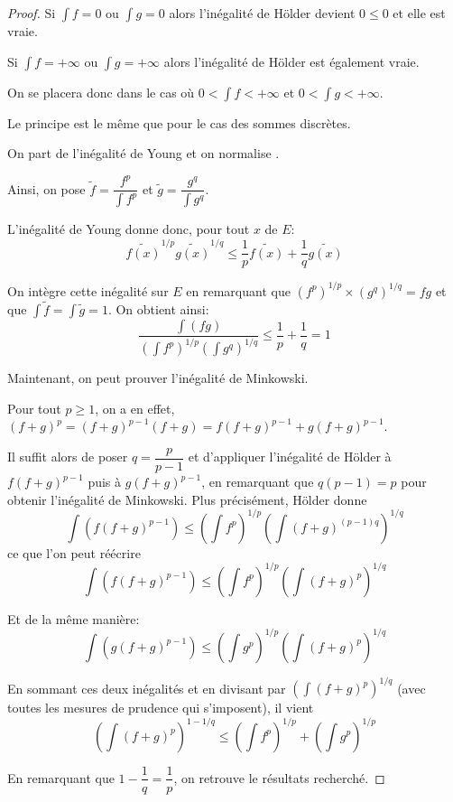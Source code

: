 \begin{proof}
Si $\displaystyle{\int} f =0$ ou $\displaystyle{\int} g =0$ alors l'inégalité de Hölder devient $0 \leq 0$ et elle est vraie.

Si $\displaystyle{\int} f =+\infty$ ou $\displaystyle{\int} g =+\infty$ alors l'inégalité de Hölder est également vraie.

On se placera donc dans le cas où $0< \displaystyle{\int} f < +\infty$ et $0< \displaystyle{\int} g < +\infty$.

Le principe est le même que pour le cas des sommes discrètes.

On part de l'inégalité de Young et on \og normalise \fg{}.

Ainsi, on pose $\tilde{f} = \dfrac{f^p}{\displaystyle{\int} f^p}$ et $\tilde{g} = \dfrac{g^q}{\displaystyle{\int} g^q}$.

L'inégalité de Young donne donc, pour tout $x$ de $E$:
\[
\widetilde{f(x)}^{1/p} \widetilde{g(x)}^{1/q} \leq \dfrac{1}{p} \widetilde{f(x)} + \dfrac{1}{q} \widetilde{g(x)}
\]

On intègre cette inégalité sur $E$ en remarquant que $\left(f^p\right)^{1/p} \times \left(g^q\right)^{1/q} = fg$ et que $\displaystyle{\int} \tilde{f} = \displaystyle{\int} \tilde{g} = 1$. On obtient ainsi:
\[
\dfrac{\displaystyle{\int} \left(fg\right)}{\left(\displaystyle{\int} f^p\right)^{1/p}\left(\displaystyle{\int} g^q\right)^{1/q}} \leq 
\dfrac{1}{p} + \dfrac{1}{q} = 1
\]

Maintenant, on peut prouver l'inégalité de Minkowski.

Pour tout $p \geq 1$, on a en effet, $(f+g)^p = (f+g)^{p-1} (f+g) = f(f+g)^{p-1}+g(f+g)^{p-1}$. 

Il suffit alors de poser $q = \dfrac{p}{p-1}$ et d'appliquer l'inégalité de Hölder à $f(f+g)^{p-1}$ puis à $g(f+g)^{p-1}$, en remarquant que $q(p-1)=p$  pour obtenir l'inégalité de Minkowski. Plus précisément, Hölder donne
\[
\displaystyle{\int} \left(f(f+g)^{p-1}\right) \leq \left(\displaystyle{\int} f^p \right)^{1/p} \left(\displaystyle{\int} (f+g)^{(p-1)q} \right)^{1/q}
\]
ce que l'on peut réécrire
\[
\displaystyle{\int} \left(f(f+g)^{p-1}\right) \leq  \left(\displaystyle{\int} f^p \right)^{1/p} \left(\displaystyle{\int} (f+g)^{p} \right)^{1/q}
\]

Et de la même manière:
\[
\displaystyle{\int} \left(g(f+g)^{p-1}\right) \leq  \left(\displaystyle{\int} g^p \right)^{1/p} \left(\displaystyle{\int} (f+g)^{p} \right)^{1/q}
\]

En sommant ces deux inégalités et en divisant par $\left(\displaystyle{\int} (f+g)^{p} \right)^{1/q}$ (avec toutes les mesures de prudence qui s'imposent), il vient
\[
\left(\displaystyle{\int} (f+g)^p\right)^{1-1/q} \leq \left(\displaystyle{\int} f^p \right)^{1/p} + \left(\displaystyle{\int} g^p \right)^{1/p}
\]

En remarquant que $1-\dfrac{1}{q} = \dfrac{1}{p}$, on retrouve le résultats recherché.
\end{proof}

